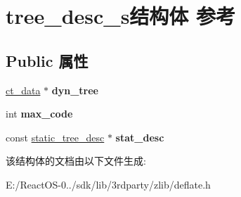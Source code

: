 \hypertarget{structtree__desc__s}{}\section{tree\+\_\+desc\+\_\+s结构体 参考}
\label{structtree__desc__s}
\subsection*{Public 属性}
\begin{DoxyCompactItemize}
\item 
\mbox{\label{structtree__desc__s_a5c79989c018b96c729e88e41f98a4920}} 
\hyperlink{structct__data}{ct\+\_\+data} $\ast$ {\bfseries dyn\+\_\+tree}
\item 
\mbox{\label{structtree__desc__s_a11f42f2c0464693def462dcfdd871002}} 
int {\bfseries max\+\_\+code}
\item 
\mbox{\label{structtree__desc__s_afc69be1c7b75c748e6b0bf1969a9560f}} 
const \hyperlink{structstatic__tree__desc__s}{static\+\_\+tree\+\_\+desc} $\ast$ {\bfseries stat\+\_\+desc}
\end{DoxyCompactItemize}


该结构体的文档由以下文件生成\+:\begin{DoxyCompactItemize}
\item 
E\+:/\+React\+O\+S-\/0../sdk/lib/3rdparty/zlib/deflate.\+h\end{DoxyCompactItemize}
